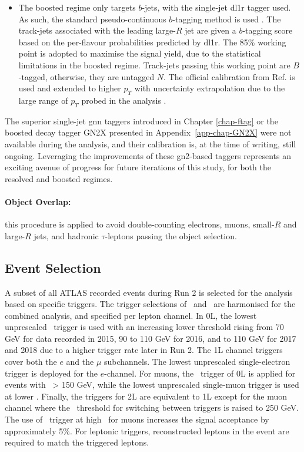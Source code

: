 \begin{itemize}[leftmargin=*]
\item The boosted regime only targets $b$-jets, with the single-jet \gls{dl1r} tagger used. As such, the standard pseudo-continuous $b$-tagging method is used \cite{atlas:FTAGRUN2}. The track-jets associated with the leading large-$R$ jet are given a $b$-tagging score based on the per-flavour probabilities predicted by \gls{dl1r}. The 85\% working point is adopted to maximise the signal yield, due to the statistical limitations in the boosted regime. Track-jets passing this working point are $B$-tagged, otherwise, they are untagged $N$. The official calibration from Ref. \cite{atlas:FTAGRUN2} is used and extended to higher $p_T$ with uncertainty extrapolation due to the large range of $p_T$ probed in the analysis \cite{cjettaggingCalib, ATLAS:2023lwk}.
\end{itemize}
The superior single-jet \gls{gnn} taggers introduced in Chapter \ref{chap-ftag} or the boosted decay tagger GN2X \cite{ATL-PHYS-PUB-2023-021} presented in Appendix~\ref{app-chap-GN2X} were not available during the analysis, and their calibration is, at the time of writing, still ongoing. Leveraging the improvements of these \gls{gn2}-based taggers represents an exciting avenue of progress for future iterations of this study, for both the resolved and boosted regimes. 

\paragraph{Object Overlap:} this procedure is applied to avoid double-counting electrons, muons, small-$R$ and large-$R$ jets, and hadronic $\tau$-leptons passing the object selection.

\subsection{Event Selection}\label{sec-regimeCat}
A subset of all ATLAS recorded events during Run 2 is selected for the analysis based on specific triggers. The trigger selections of \vhb\ and \vhc\ are harmonised for the combined analysis, and specified per lepton channel. In 0L, the lowest unprescaled \etm\ trigger is used with an increasing lower threshold rising from 70 GeV for data recorded in 2015, 90 to 110 GeV for 2016, and to 110 GeV for 2017 and 2018 due to a higher trigger rate later in Run 2. The 1L channel triggers cover both the $e$ and the $\mu$ subchannels. The lowest unprescaled single-electron trigger is deployed for the $e$-channel. For muons, the \etm\ trigger of 0L is applied for events with \ptv\ > 150 GeV, while the lowest unprescaled single-muon trigger is used at lower \ptv. Finally, the triggers for 2L are equivalent to 1L except for the muon channel where the \ptv\ threshold for switching between triggers is raised to 250 GeV. The use of \etm\ trigger at high \ptv\ for muons increases the signal acceptance by approximately 5\%. For leptonic triggers, reconstructed leptons in the event are required to match the triggered leptons. \\ 

